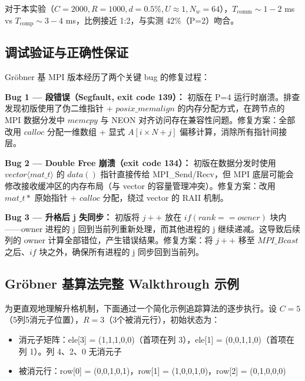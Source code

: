 \documentclass[a4paper]{article}
\begin{document}
对于本实验（$C=2000, R=1000, d=0.5\%, U\approx 1, N_w=64$），$T_{\text{comm}} \sim 1-2$ ms vs $T_{\text{comp}} \sim 3-4$ ms，比例接近 1:2，与实测 42\%（P=2）吻合。

\subsection{调试验证与正确性保证}

Gröbner 基 MPI 版本经历了两个关键 bug 的修复过程：

\textbf{Bug 1 — 段错误（Segfault, exit code 139）：} 初版在 P=4 运行时崩溃。排查发现初版使用了伪二维指针 + $posix\_memalign$ 的内存分配方式，在跨节点的 MPI 数据分发中 $memcpy$ 与 NEON 对齐访问存在兼容性问题。修复方案：全部改用 $calloc$ 分配一维数组 + 显式 $A[i \times N + j]$ 偏移计算，消除所有指针间接层。

\textbf{Bug 2 — Double Free 崩溃（exit code 134）：} 初版在数据分发时使用 $vector\langle mat\_t\rangle$ 的 $data()$ 指针直接传给 MPI\_Send/Recv，但 MPI 底层可能会修改接收缓冲区的内存布局（与 vector 的容量管理冲突）。修复方案：改用 $mat\_t*$ 原始指针 + $calloc$ 分配，绕过 vector 的 RAII 机制。

\textbf{Bug 3 — 升格后 j 失同步：} 初版将 $j++$ 放在 $if (rank == owner)$ 块内——owner 进程的 j 回到当前列重新处理，而其他进程的 j 继续递减。这导致后续列的 owner 计算全部错位，产生错误结果。修复方案：将 $j++$ 移至 $MPI\_Bcast$ 之后、$if$ 块之外，确保所有进程的 j 同步回到当前列。

\subsection{Gröbner 基算法完整 Walkthrough 示例}

为更直观地理解升格机制，下面通过一个简化示例追踪算法的逐步执行。设 $C=5$（5列5消元子位置），$R=3$（3个被消元行），初始状态为：

\begin{itemize}
    \item 消元子矩阵：ele[3] = (1,1,1,0,0)（首项在列 3），ele[1] = (0,0,1,1,0)（首项在列 1）。列 4、2、0 无消元子
    \item 被消元行：row[0] = (0,0,1,0,1)，row[1] = (1,0,0,1,0)，row[2] = (0,1,0,0,0)
\end{itemize}
\end{document}

